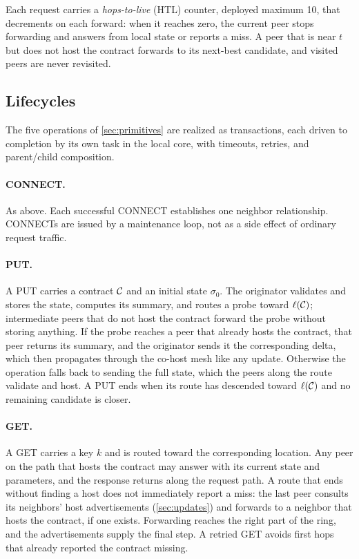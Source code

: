 Each request carries a \emph{hops-to-live} (HTL) counter, deployed maximum 10, that decrements on each forward: when it reaches zero, the current peer stops forwarding and answers from local state or reports a miss. A peer that is near $t$ but does not host the contract forwards to its next-best candidate, and visited peers are never revisited.

\subsection{Lifecycles}

The five operations of \cref{sec:primitives} are realized as transactions, each driven to completion by its own task in the local core, with timeouts, retries, and parent/child composition.

\paragraph{\textsf{CONNECT}.} As above. Each successful \textsf{CONNECT} establishes one neighbor relationship. \textsf{CONNECT}s are issued by a maintenance loop, not as a side effect of ordinary request traffic.

\paragraph{\textsf{PUT}.} A \textsf{PUT} carries a contract $\mathcal{C}$ and an initial state $\sigma_0$. The originator validates and stores the state, computes its summary, and routes a probe toward $\ell(\mathcal{C})$; intermediate peers that do not host the contract forward the probe without storing anything. If the probe reaches a peer that already hosts the contract, that peer returns its summary, and the originator sends it the corresponding delta, which then propagates through the co-host mesh like any update. Otherwise the operation falls back to sending the full state, which the peers along the route validate and host. A \textsf{PUT} ends when its route has descended toward $\ell(\mathcal{C})$ and no remaining candidate is closer.

\paragraph{\textsf{GET}.} A \textsf{GET} carries a key $k$ and is routed toward the corresponding location. Any peer on the path that hosts the contract may answer with its current state and parameters, and the response returns along the request path. A route that ends without finding a host does not immediately report a miss: the last peer consults its neighbors' host advertisements (\cref{sec:updates}) and forwards to a neighbor that hosts the contract, if one exists. Forwarding reaches the right part of the ring, and the advertisements supply the final step. A retried \textsf{GET} avoids first hops that already reported the contract missing.


